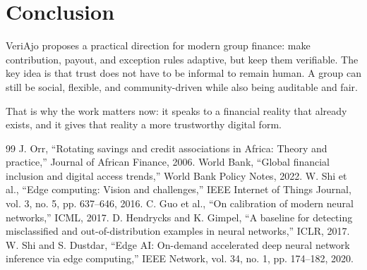 \documentclass[10pt, conference]{IEEEtran}
\begin{document}
\section{Conclusion}
VeriAjo proposes a practical direction for modern group finance: make contribution, payout, and exception rules adaptive, but keep them verifiable. The key idea is that trust does not have to be informal to remain human. A group can still be social, flexible, and community-driven while also being auditable and fair.

That is why the work matters now: it speaks to a financial reality that already exists, and it gives that reality a more trustworthy digital form.

\begin{thebibliography}{99}
 J. Orr, ``Rotating savings and credit associations in Africa: Theory and practice,'' Journal of African Finance, 2006.
 World Bank, ``Global financial inclusion and digital access trends,'' World Bank Policy Notes, 2022.
 W. Shi et al., ``Edge computing: Vision and challenges,'' IEEE Internet of Things Journal, vol. 3, no. 5, pp. 637--646, 2016.
 C. Guo et al., ``On calibration of modern neural networks,'' ICML, 2017.
 D. Hendrycks and K. Gimpel, ``A baseline for detecting misclassified and out-of-distribution examples in neural networks,'' ICLR, 2017.
 W. Shi and S. Dustdar, ``Edge AI: On-demand accelerated deep neural network inference via edge computing,'' IEEE Network, vol. 34, no. 1, pp. 174--182, 2020.
\end{thebibliography}
\end{document}
